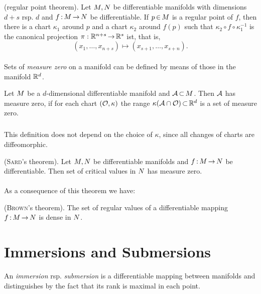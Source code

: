 \documentclass[11pt,twoside]{article}
\begin{document}
\begin{theorem}
(regular point theorem).
Let ${M},{N}$ be differentiable manifolds with dimensions
$d+s$ rsp. $d$ and $f{\,:\,} {M} {\,\to\,} {N}$ be differentiable.
If $p {\,\in\,} {M}$ is a regular point of $f$,
then there is a chart $\kappa_1$ around $p$
and a chart $\kappa_2$ around $f(p)$
such that
$\kappa_2 \circ f \circ \kappa_1^{-1}$ is the canonical projection
$\pi:{\mathbb{R}}^{n+s} {\,\to\,} {\mathbb{R}}^s$ ist,
that is,
\[
(x_1,\ldots,x_{n+s}) \mapsto (x_{s+1},\ldots,x_{s+n}).
\]
\end{theorem}

\paragraph{}
Sets of \textit{measure zero} on a manifold can be defined 
by means of those in the manifold ${\mathbb{R}}^d$.

\begin{definition}
Let ${M}$ be a $d$-dimensional differentiable manifold
and ${\mathcal{A}} {\,\subset\,} {M}$.
Then ${\mathcal{A}}$ has measure zero,
if for each chart $(\mathcal{O},\kappa)$ the range
$\kappa({\mathcal{A}} \cap \mathcal{O}) {\,\subset\,} {\mathbb{R}}^d$ is a set of measure zero.
\end{definition}

\subparagraph{}
This definition does not depend on the choice of $\kappa$,
since all changes of charts are diffeomorphic.

\begin{theorem} (\textsc{Sard}'s theorem).
Let ${M},{N}$ be differentiable manifolds
and $f {\,:\,} {M} {\,\to\,} {N}$ be differentiable.
Then set of critical values in ${N}$ has measure zero.
\end{theorem}

\paragraph{}
As a consequence of this theorem we have:

\begin{theorem} (\textsc{Brown}'s theorem).
The set of regular values of a differentiable mapping $f {\,:\,} {M} {\,\to\,} {N}$
is dense in ${N}$.
\end{theorem}

\section{Immersions and Submersions}
An \textit{immersion} rsp. \textit{submersion} is a differentiable mapping
between manifolds and distinguishes by the fact
that its rank is maximal in each point.
\end{document}
